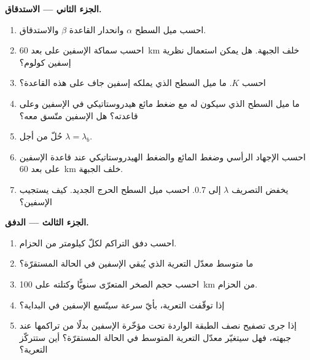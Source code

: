 \begin{problem}
\medskip\noindent\textbf{الجزء الثاني --- الاستدقاق.}
\begin{enumerate}[resume]
  \item احسب ميل السطح $\alpha$ وانحدار القاعدة $\beta$
        والاستدقاق.
  \item احسب سماكة الإسفين على بعد \qty{60}{km} خلف الجبهة. هل يمكن
        استعمال نظرية إسفين كولوم؟
  \item احسب $K$. ما ميل السطح الذي يملكه إسفين جاف على هذه القاعدة؟
  \item ما ميل السطح الذي سيكون له مع ضغط مائع هيدروستاتيكي في
        الإسفين وعلى قاعدته؟ هل الإسفين متّسق معه؟
  \item حُلّ  من أجل $\lambda = \lambda_b$.
  \item احسب الإجهاد الرأسي وضغط المائع والضغط
        الهيدروستاتيكي عند قاعدة الإسفين على بعد \qty{60}{km} خلف الجبهة.
  \item يخفض التصريف $\lambda$ إلى 0.7. احسب ميل السطح الحرج
        الجديد. كيف يستجيب الإسفين؟
\end{enumerate}

\medskip\noindent\textbf{الجزء الثالث --- الدفق.}
\begin{enumerate}[resume]
  \item احسب دفق التراكم لكلّ كيلومتر من الحزام.
  \item ما متوسط معدّل التعرية الذي يُبقي الإسفين في الحالة المستقرّة؟
  \item احسب حجم الصخر المتعرّى سنويًّا وكتلته
        على \qty{100}{km} من الحزام.
  \item إذا توقّفت التعرية، بأيّ سرعة سيتّسع الإسفين في البداية؟
  \item إذا جرى تصفيح نصف الطبقة الواردة تحت مؤخّرة
        الإسفين بدلًا من تراكمها عند جبهته، فهل سيتغيّر معدّل التعرية المتوسط
        في الحالة المستقرّة؟ أين ستتركّز التعرية؟
\end{enumerate}


\end{problem}
